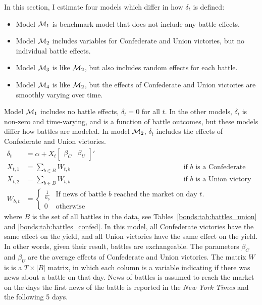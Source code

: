 In this section, I estimate four models which differ in how $\delta_{t}$ is defined:
\begin{itemize}
\item Model $\mathcal{M}_{\text{1}}$ is benchmark model that does not include any battle effects.
\item Model $\mathcal{M}_{\text{2}}$ includes variables for Confederate and Union victories, but no individual battle effects.
\item Model $\mathcal{M}_{\text{3}}$ is like $\mathcal{M}_{\text{2}}$, but also includes random effects for each battle.
\item Model $\mathcal{M}_{\text{4}}$ is like $\mathcal{M}_{\text{2}}$, but the effects of Confederate and Union victories are smoothly varying over time.
\end{itemize}
Model $\mathcal{M}_{\text{1}}$ includes no battle effects, $\delta_{t} = 0$ for all $t$.
In the other models, $\delta_{t}$ is non-zero and time-varying, and is a function of battle outcomes, but these models differ how battles are modeled.
In model $\mathcal{M}_{\text{2}}$, $\delta_{t}$ includes the effects of Confederate and Union victories.
\begin{align}
  \label{bonds:eq:2}
  \delta_{t} &= \alpha + X_{t} \begin{bmatrix}\beta_{C} & \beta_{U}\end{bmatrix}'  \\
  X_{t, 1} &= \sum_{b \in B} W_{t,b} && \text{if $b$ is a Confederate victory} \\
  X_{t, 2} &= \sum_{b \in B} W_{t,b} && \text{if $b$ is a Union victory} \\
  W_{b,t} &= 
            \begin{cases}
              \frac{1}{n_{b}} & \text{If news of battle $b$ reached the market on day $t$.} \\
              0 & \text{otherwise}
            \end{cases}
\end{align}
where $B$ is the set of all battles in the data, see Tables~\ref{bonds:tab:battles_union} and \ref{bonds:tab:battles_confed}.
In this model, all Confederate victories have the same effect on the yield, and all Union victories have the same effect on the yield. 
In other words, given their result, battles are exchangeable.
The parameters $\beta_{C}$ and $\beta_{U}$ are the average effects of Confederate and Union victories.
The matrix $W$ is is a $T \times |B|$ matrix, in which each column is a variable indicating if there was news about a battle on that day.
News of battles is assumed to reach the market on the days the first news of the battle is reported in the \textit{New York Times} and the following 5 days.
